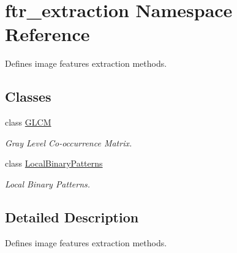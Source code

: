 \hypertarget{namespaceftr__extraction}{}\section{ftr\+\_\+extraction Namespace Reference}
\label{namespaceftr__extraction}


Defines image features extraction methods.  


\subsection*{Classes}
\begin{DoxyCompactItemize}
\item 
class \mbox{\hyperlink{classftr__extraction_1_1_g_l_c_m}{G\+L\+CM}}
\begin{DoxyCompactList}\small\item\em Gray Level Co-\/occurrence Matrix. \end{DoxyCompactList}\item 
class \mbox{\hyperlink{classftr__extraction_1_1_local_binary_patterns}{Local\+Binary\+Patterns}}
\begin{DoxyCompactList}\small\item\em Local Binary Patterns. \end{DoxyCompactList}\end{DoxyCompactItemize}


\subsection{Detailed Description}
Defines image features extraction methods. 